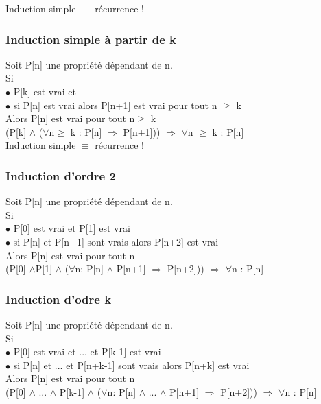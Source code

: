 Induction simple $\equiv$ récurrence !
\subsubsection{Induction simple à partir de k}
Soit P[n] une propriété dépendant de n.\\
Si\\ $\bullet$ P[k] est vrai et \\ $\bullet$ si P[n] est vrai alors P[n+1] est vrai pour tout n $\geq$ k \\ Alors P[n] est vrai pour tout n$\geq$ k\\

(P[k] $\wedge$ ($\forall$n$\geq$ k : P[n] $\Rightarrow$ P[n+1])) $\Rightarrow$ $\forall$n $\geq$ k : P[n]\\

Induction simple $\equiv$ récurrence !
\subsubsection{Induction d'ordre 2}
Soit P[n] une propriété dépendant de n.\\
Si\\ $\bullet$ P[0] est vrai et P[1] est vrai \\ $\bullet$ si P[n] et P[n+1] sont vrais alors P[n+2] est vrai\\ Alors P[n] est vrai pour tout n\\

(P[0] $\wedge$P[1] $\wedge$ ($\forall$n: P[n] $\wedge$ P[n+1] $\Rightarrow$ P[n+2])) $\Rightarrow$ $\forall$n  : P[n]\\

\subsubsection{Induction d'odre k}
Soit P[n] une propriété dépendant de n.\\
Si\\ $\bullet$ P[0] est vrai et ... et P[k-1] est vrai \\ $\bullet$ si P[n] et ... et P[n+k-1] sont vrais alors P[n+k] est vrai\\ Alors P[n] est vrai pour tout n\\

(P[0] $\wedge$ ... $\wedge$ P[k-1] $\wedge$ ($\forall$n: P[n] $\wedge$ ... $\wedge$ P[n+1] $\Rightarrow$ P[n+2])) $\Rightarrow$ $\forall$n  : P[n]\\

